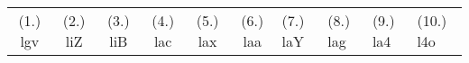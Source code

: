 \begin{eocexercises}{}
\begin{enumerate}[itemsep=6pt, label=\textbf{\arabic*}.]
  \end{enumerate}
\practiceinfo
\par 
\par \begin{tabular}[h]{cccccc}
(1.) lgv  &  (2.) liZ  &  (3.) liB  &  (4.) lac  &  (5.) lax  &  (6.) laa  &  (7.) laY  &  (8.) lag  &  (9.) la4  &  (10.) l4o  & \end{tabular}
\end{eocexercises}
